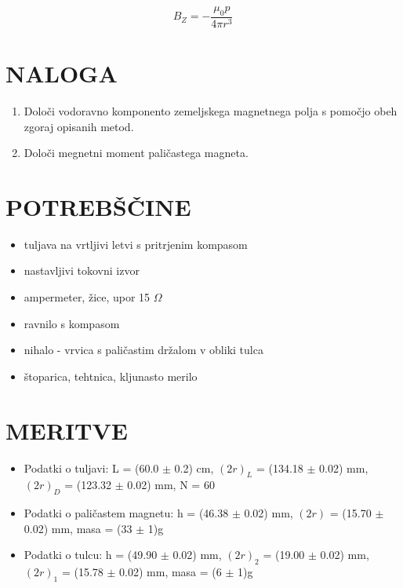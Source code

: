 \documentclass[12pt,a4paper]{article}
\begin{document}
\begin{equation}
	{B_{Z} = - \frac{\mu_0 p}{4 \pi r^3}}
\end{equation}


\section{NALOGA}

\begin{enumerate}
	\item Dolo\v ci vodoravno komponento zemeljskega magnetnega polja s pomo\v cjo obeh zgoraj opisanih metod.
	\item Dolo\v ci megnetni moment pali\v castega magneta.
\end{enumerate}


\section{POTREB\v S\v CINE}

\begin{itemize}
	\item tuljava na vrtljivi letvi s pritrjenim kompasom
	\item nastavljivi tokovni izvor
	\item ampermeter, \v zice, upor 15 $\Omega$
	\item ravnilo s kompasom
	\item nihalo - vrvica s pali\v castim dr\v zalom v obliki tulca
	\item \v stoparica, tehtnica, kljunasto merilo
\end{itemize}

\section{MERITVE}

\begin{itemize}
	\item Podatki o tuljavi: L = (60.0 $\pm$ 0.2) cm, $(2r)_{L}$ = (134.18 $\pm$ 0.02) mm, $(2r)_{D}$ = (123.32 $\pm$ 0.02) mm, N = 60
	\item Podatki o pali\v castem magnetu: h = (46.38 $\pm$ 0.02) mm, $(2r)$ = (15.70 $\pm$ 0.02) mm, masa = (33 $\pm$ 1)g
	\item Podatki o tulcu: h = (49.90 $\pm$ 0.02) mm, $(2r)_{2}$ = (19.00 $\pm$ 0.02) mm, $(2r)_{1}$ = (15.78 $\pm$ 0.02) mm, masa = (6 $\pm$ 1)g
\end{itemize}

\vspace{0.5cm}
\end{document}
